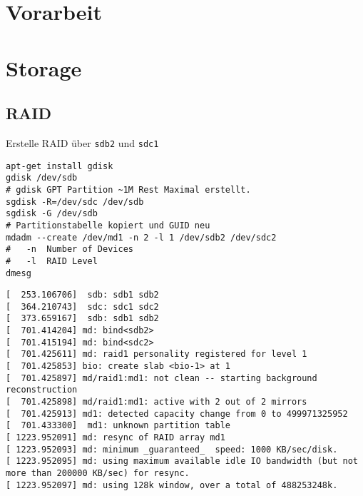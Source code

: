 \chapter{Vorarbeit}
\label{chap:whezzy_ugprade}

\chapter{Storage}
\section{RAID}
Erstelle RAID über \verb#sdb2# und \verb#sdc1#
\begin{verbatim}
apt-get install gdisk
gdisk /dev/sdb
# gdisk GPT Partition ~1M Rest Maximal erstellt.
sgdisk -R=/dev/sdc /dev/sdb
sgdisk -G /dev/sdb
# Partitionstabelle kopiert und GUID neu
mdadm --create /dev/md1 -n 2 -l 1 /dev/sdb2 /dev/sdc2
#	-n	Number of Devices
#	-l	RAID Level
dmesg
\end{verbatim}
\setupVerbatimOut
\begin{verbatim}
[  253.106706]  sdb: sdb1 sdb2
[  364.210743]  sdc: sdc1 sdc2
[  373.659167]  sdb: sdb1 sdb2
[  701.414204] md: bind<sdb2>
[  701.415194] md: bind<sdc2>
[  701.425611] md: raid1 personality registered for level 1
[  701.425853] bio: create slab <bio-1> at 1
[  701.425897] md/raid1:md1: not clean -- starting background reconstruction
[  701.425898] md/raid1:md1: active with 2 out of 2 mirrors
[  701.425913] md1: detected capacity change from 0 to 499971325952
[  701.433300]  md1: unknown partition table
[ 1223.952091] md: resync of RAID array md1
[ 1223.952093] md: minimum _guaranteed_  speed: 1000 KB/sec/disk.
[ 1223.952095] md: using maximum available idle IO bandwidth (but not more than 200000 KB/sec) for resync.
[ 1223.952097] md: using 128k window, over a total of 488253248k.
\end{verbatim}

